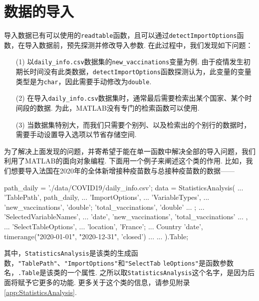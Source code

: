 \documentclass[a4paper, titlepage]{article}
\begin{document}
    \section{数据的导入}
        导入数据已有可以使用的\texttt{readtable}函数，且可以通过\texttt{detectImportOptions}函数，在导入数据前，预先探测并修改导入参数. 在此过程中，我们发现如下问题：
        \begin{enumerate}
            \item [(1)] 以\texttt{daily\_info.csv}数据集的\texttt{new\_vaccinations}变量为例. 由于疫情发生初期长时间没有此类数据，\texttt{detectImportOptions}函数探测认为，此变量的变量类型是为\texttt{char}，因此需要手动修改为\texttt{double}.
            \item [(2)] 在导入\texttt{daily\_info.csv}数据集时，通常最后需要检索出某个国家、某个时间段的数据. 为此，MATLAB没有专门的检索函数可以使用.
            \item [(3)] 当数据集特别大，而我们只需要个别列、以及检索出的个别行的数据时，需要手动设置导入选项以节省存储空间.
        \end{enumerate}
        为了解决上面发现的问题，并寄希望于能在单一函数中解决全部的导入问题，我们利用了MATLAB的面向对象编程. 下面用一个例子来阐述这个类的作用. 比如，我们想要导入法国在2020年的全体新增接种疫苗数与总接种疫苗数的数据——
\begin{matlabcode}
path_daily = './data/COVID19/daily_info.csv';
data = StatisticsAnalysis( ...
    'TablePath', path_daily, ...
    'ImportOptions', { ...
        'VariableTypes', { ...
            'new_vaccinations', 'double';
            'total_vaccinations', 'double' ...
            }; ...
        'SelectedVariableNames', ...
            {'date', 'new_vaccinations', 'total_vaccinations'} ...
        }, ...
    'SelectTableOptions', { ...
        'location', 'France'; ... Country
        'date', timerange("2020-01-01", "2020-12-31", 'closed') ...
    } ... %
    ).Table;
\end{matlabcode}
        \begin{sloppypar}
            \flushleft
            其中，\texttt{StatisticsAnalysis}是该类的生成函数，\texttt{"TablePath"}、\texttt{"ImportOptions"}和\texttt{"SelectTab} \texttt{leOptions"}是函数参数名，\texttt{.Table}是该类的一个属性. 之所以取\texttt{StatisticsAnalysis}这个名字，是因为后面将赋予它更多的功能. 更多关于这个类的信息，请参见附录\ref{app:StatisticsAnalysis}. %
        \end{sloppypar}
\end{document}
